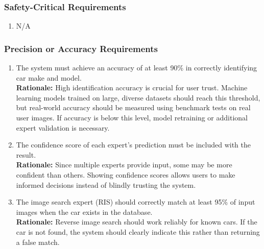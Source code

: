 \documentclass[]{article}
\begin{document}
\subsubsection{Safety-Critical Requirements}
\label{ssub:safety_critical_requirements}
\begin{enumerate}[label={PR-SC\arabic*.}]
    \item N/A
\end{enumerate}

\subsubsection{Precision or Accuracy Requirements}
\label{ssub:precision_or_accuracy_requirements}
\begin{enumerate}[label={PR-PA\arabic*.}]
    \item The system must achieve an accuracy of at least 90\% in correctly identifying car make and model.\\
	\textbf{Rationale:} High identification accuracy is crucial for user trust. Machine learning models trained on large, diverse datasets should reach this threshold, but real-world accuracy should be measured using benchmark tests on real user images. If accuracy is below this level, model retraining or additional expert validation is necessary.
	\item The confidence score of each expert’s prediction must be included with the result.\\
	\textbf{Rationale:} Since multiple experts provide input, some may be more confident than others. Showing confidence scores allows users to make informed decisions instead of blindly trusting the system.
	\item The image search expert (RIS) should correctly match at least 95\% of input images when the car exists in the database.\\
	\textbf{Rationale:} Reverse image search should work reliably for known cars. If the car is not found, the system should clearly indicate this rather than returning a false match.
\end{enumerate}
\end{document}
